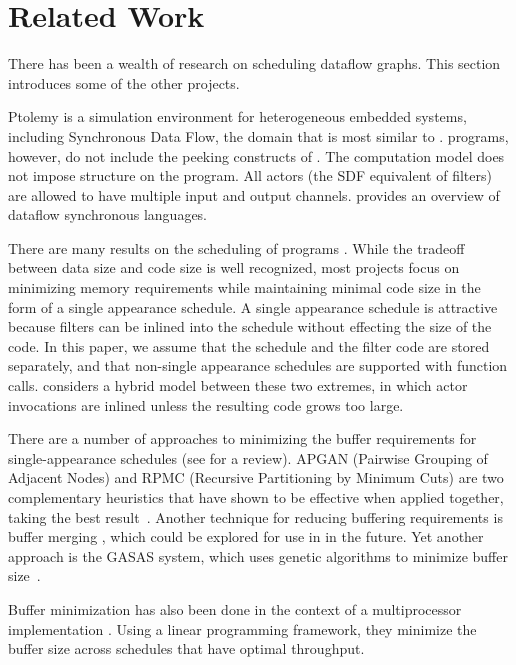 \section{Related Work}
\label{chpt:related}

There has been a wealth of research on scheduling dataflow graphs.
This section introduces some of the other projects.

Ptolemy \cite{ptolemyoverview} is a simulation environment for
heterogeneous embedded systems, including Synchronous Data Flow, the
domain that is most similar to {\StreamIt}. {\SDF} programs, however,
do not include the peeking constructs of {\StreamIt}.  The {\SDF}
computation model does not impose structure on the program.  All
actors (the SDF equivalent of filters) are allowed to have multiple
input and output channels.  \cite{benveniste93dataflow} provides an
overview of dataflow synchronous languages.

There are many results on the scheduling of {\SDF} programs
\cite{bhattacharyya99synthesis,leesdf}.  While the tradeoff between
data size and code size is well recognized, most projects focus on
minimizing memory requirements while maintaining minimal code size in
the form of a single appearance schedule.  A single appearance
schedule is attractive because filters can be inlined into the
schedule without effecting the size of the code.  In this paper, we
assume that the schedule and the filter code are stored separately,
and that non-single appearance schedules are supported with function
calls. \cite{bhat1999x1} considers a hybrid model between these two
extremes, in which actor invocations are inlined unless the resulting
code grows too large.

There are a number of approaches to minimizing the buffer requirements
for single-appearance schedules (see \cite{bhattacharyya99synthesis}
for a review).  APGAN (Pairwise Grouping of Adjacent Nodes) and RPMC
(Recursive Partitioning by Minimum Cuts) are two complementary
heuristics that have shown to be effective when applied together,
taking the best result~\cite{Bhatta97}.  Another technique for
reducing buffering requirements is buffer merging
\cite{murt1999x3,murt2000x2}, which could be explored for use in
{\StreamIt} in the future.  Yet another approach is the GASAS system,
which uses genetic algorithms to minimize buffer size~\cite{GASAS}.

Buffer minimization has also been done in the context of a
multiprocessor implementation \cite{govindarajan-minimizing}. Using a
linear programming framework, they minimize the buffer size across
schedules that have optimal throughput.

